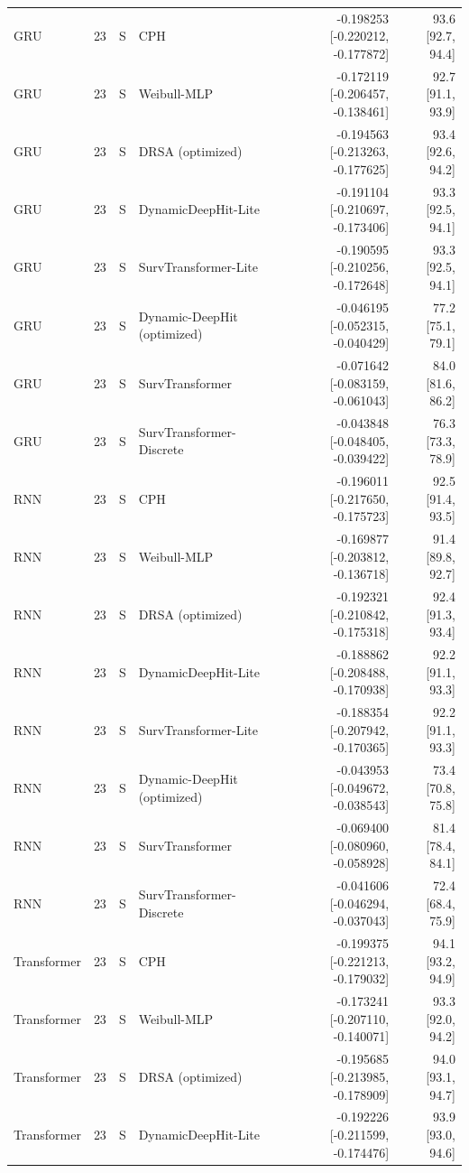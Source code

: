 \begin{longtable}{lll p{3.0cm} rr}
GRU & 23 & S & CPH & -0.198253 [-0.220212, -0.177872] & 93.6 [92.7, 94.4]\\
GRU & 23 & S & Weibull-MLP & -0.172119 [-0.206457, -0.138461] & 92.7 [91.1, 93.9]\\
GRU & 23 & S & DRSA (optimized) & -0.194563 [-0.213263, -0.177625] & 93.4 [92.6, 94.2]\\
GRU & 23 & S & DynamicDeepHit-Lite & -0.191104 [-0.210697, -0.173406] & 93.3 [92.5, 94.1]\\
GRU & 23 & S & SurvTransformer-Lite & -0.190595 [-0.210256, -0.172648] & 93.3 [92.5, 94.1]\\
GRU & 23 & S & Dynamic-DeepHit (optimized) & -0.046195 [-0.052315, -0.040429] & 77.2 [75.1, 79.1]\\
GRU & 23 & S & SurvTransformer & -0.071642 [-0.083159, -0.061043] & 84.0 [81.6, 86.2]\\
GRU & 23 & S & SurvTransformer-Discrete & -0.043848 [-0.048405, -0.039422] & 76.3 [73.3, 78.9]\\
RNN & 23 & S & CPH & -0.196011 [-0.217650, -0.175723] & 92.5 [91.4, 93.5]\\
RNN & 23 & S & Weibull-MLP & -0.169877 [-0.203812, -0.136718] & 91.4 [89.8, 92.7]\\
RNN & 23 & S & DRSA (optimized) & -0.192321 [-0.210842, -0.175318] & 92.4 [91.3, 93.4]\\
RNN & 23 & S & DynamicDeepHit-Lite & -0.188862 [-0.208488, -0.170938] & 92.2 [91.1, 93.3]\\
RNN & 23 & S & SurvTransformer-Lite & -0.188354 [-0.207942, -0.170365] & 92.2 [91.1, 93.3]\\
RNN & 23 & S & Dynamic-DeepHit (optimized) & -0.043953 [-0.049672, -0.038543] & 73.4 [70.8, 75.8]\\
RNN & 23 & S & SurvTransformer & -0.069400 [-0.080960, -0.058928] & 81.4 [78.4, 84.1]\\
RNN & 23 & S & SurvTransformer-Discrete & -0.041606 [-0.046294, -0.037043] & 72.4 [68.4, 75.9]\\
Transformer & 23 & S & CPH & -0.199375 [-0.221213, -0.179032] & 94.1 [93.2, 94.9]\\
Transformer & 23 & S & Weibull-MLP & -0.173241 [-0.207110, -0.140071] & 93.3 [92.0, 94.2]\\
Transformer & 23 & S & DRSA (optimized) & -0.195685 [-0.213985, -0.178909] & 94.0 [93.1, 94.7]\\
Transformer & 23 & S & DynamicDeepHit-Lite & -0.192226 [-0.211599, -0.174476] & 93.9 [93.0, 94.6]\\

\end{longtable}
